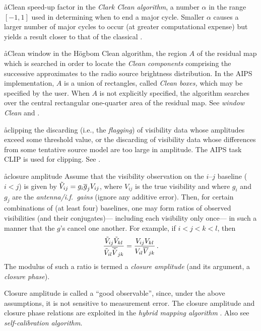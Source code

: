 \aa{Clean speed-up factor}
in the {\it Clark Clean algorithm}, a number $\alpha$ in the
range $[-1,1]$ used in determining when to end a major cycle.
Smaller $\alpha$ causes a larger number of major cycles to occur
(at greater computational expense)
but yields a result closer to that of the classical \hca.

\aa{Clean window}
in the H\"ogbom Clean algorithm, the region $A$ of the residual map
which is searched in order to locate the {\it Clean components}
comprising the successive approximates to the radio
source brightness distribution.
In the AIPS implementation, $A$ is a union of
rectangles, called {\it Clean boxes,} which may be specified
by the user.
When $A$ is not explicitly specified, the algorithm
searches over the central rectangular one-quarter area of the residual map.
See {\it window Clean} and \hca.

\aa{clipping}
the discarding (i.e., the {\it flagging}\/) of visibility data whose
amplitudes exceed some threshold value, or the discarding of visibility
data whose differences from some tentative source model are too large
in amplitude.
The AIPS task CLIP is used for clipping.
See .

\aa{closure amplitude}
Assume that the visibility observation on the $i$--$j$ baseline
($i<j$) is given by
$\tilde V_{ij}=g_i\overline g_jV_{ij}$, where $V_{ij}$ is the true
visibility and where $g_i$ and $g_j$ are the {\it antenna/i.f.\ gains}
(ignore any additive error).
Then, for certain combinations of (at least four) baselines,
one may form ratios of observed visibilities (and their conjugates)---%
including each visibility only once---%
in such a manner that the $g$'s cancel one another.
For example, if $i<j<k<l$, then
$${\tilde V_{ij}\tilde V_{kl}\over\tilde V_{il}{\overline{\tilde V}}_{jk}} =
{V_{ij}V_{kl}\over V_{il}\overline{V}_{jk}}\,.$$
The modulus of such a ratio is termed a {\it closure amplitude}
(and its argument, a {\it closure phase}).
\par
Closure amplitude is called a ``good observable'',
since, under the above assumptions, it is not sensitive to
measurement error.
The closure amplitude and closure phase relations are
exploited in the {\it hybrid mapping algorithm} \qv.
Also see {\it self-calibration algorithm}.

